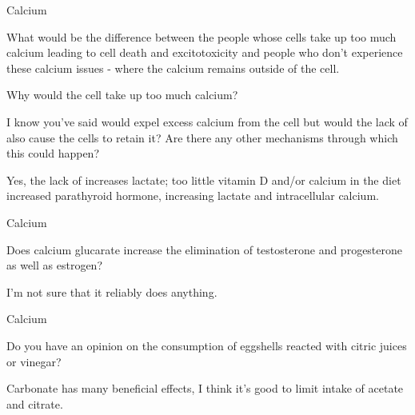 \documentclass[11pt,oneside,openany,extrafontsizes]{memoir}
\begin{document}
\begin{qaexchange}{Calcium}

    \begin{question}
        What would be the difference between the people whose cells take up too much calcium leading to cell death and excitotoxicity and people who don't experience these calcium issues - where the calcium remains outside of the cell.

		Why would the cell take up too much calcium?

		I know you've said  would expel excess calcium from the cell but would the lack of  also cause the cells to retain it? Are there any other mechanisms through which this could happen?
    \end{question}

    \begin{answer}
      Yes, the lack of  increases lactate; too little vitamin D and/or calcium in the diet increased parathyroid hormone, increasing lactate and intracellular calcium.
    \end{answer}
\end{qaexchange}

\begin{qaexchange}{Calcium}

    \begin{question}
        Does calcium glucarate increase the elimination of testosterone and progesterone as well as estrogen?
    \end{question}

    \begin{answer}
      I'm not sure that it reliably does anything.
    \end{answer}
\end{qaexchange}

\begin{qaexchange}{Calcium}

    \begin{question}
        Do you have an opinion on the consumption of eggshells reacted with citric juices or vinegar?
    \end{question}

    \begin{answer}
      Carbonate has many beneficial effects, I think it's good to limit intake of acetate and citrate.
    \end{answer}
\end{qaexchange}
\end{document}

